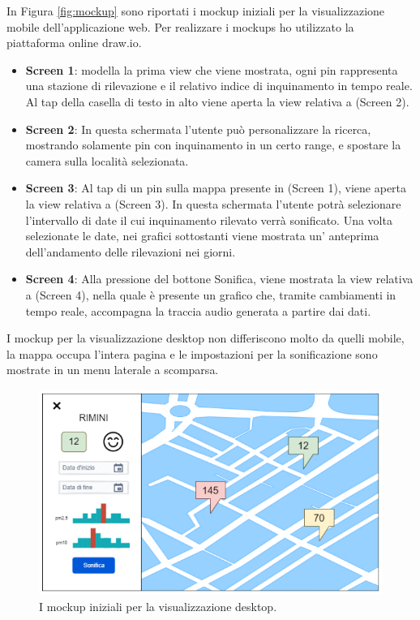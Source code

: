 In Figura \ref{fig:mockup} sono riportati i mockup iniziali per la visualizzazione mobile dell'applicazione web.
Per realizzare i mockups ho utilizzato la piattaforma online draw.io.
\begin{itemize}
    \item \textbf{Screen 1}: modella la prima view che viene mostrata, ogni pin rappresenta una stazione di rilevazione e il relativo indice di inquinamento in tempo reale. Al tap della casella di testo in alto viene aperta la view relativa a (Screen 2).
    \item \textbf{Screen 2}: In questa schermata l’utente può personalizzare la ricerca, mostrando solamente pin con inquinamento in un certo range, e spostare la camera sulla località selezionata.
    \item \textbf{Screen 3}: Al tap di un pin sulla mappa presente in (Screen 1), viene aperta la view relativa a (Screen 3). In questa schermata l’utente potrà selezionare l’intervallo di date il cui inquinamento rilevato verrà sonificato. Una volta selezionate le date, nei grafici sottostanti viene mostrata un’ anteprima dell’andamento delle rilevazioni nei giorni.
    \item \textbf{Screen 4}: Alla pressione del bottone Sonifica, viene mostrata la view relativa a (Screen 4), nella quale è presente un grafico che, tramite cambiamenti in tempo reale, accompagna la traccia audio generata a partire dai dati.
\end{itemize}

I mockup per la visualizzazione desktop non differiscono molto da quelli mobile, la mappa occupa l'intera pagina e le impostazioni per la sonificazione sono mostrate in un menu laterale a scomparsa.
\begin{figure}[H]
    \includegraphics[width=\linewidth]{img/desktopmockup.PNG}
    \caption{I mockup iniziali per la visualizzazione desktop.}
    \label{fig:desktopmockup}
\end{figure}




